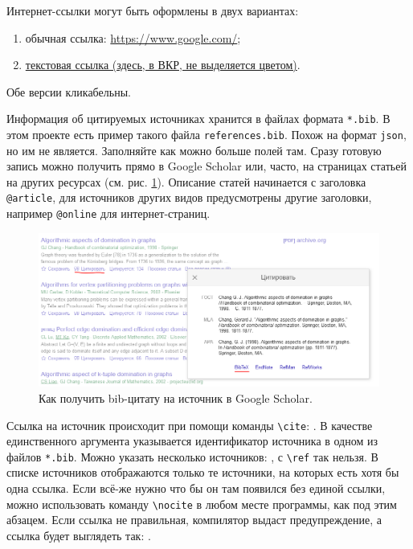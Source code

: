 \documentclass[a4paper, 14pt]{extreport}
\begin{document}
Интернет-ссылки могут быть оформлены в двух вариантах:
\begin{enumerate}
    \item обычная ссылка: \url{https://www.google.com/};
    \item \href{https://www.google.com/}{текстовая ссылка (здесь, в ВКР, не выделяется цветом)}.
\end{enumerate}
Обе версии кликабельны.

Информация об цитируемых источниках хранится в файлах формата \verb!*.bib!. В этом проекте есть пример такого файла \verb!references.bib!. Похож на формат \verb!json!, но им не является. Заполняйте как можно больше полей там. Сразу готовую запись можно получить прямо в Google Scholar или, часто, на страницах статьей на других ресурсах (см. рис. \ref{fig:scholar}). Описание статей начинается с заголовка \verb!@article!, для источников других видов предусмотрены другие заголовки, например \verb!@online! для интернет-страниц.

\begin{figure}[h]
    \centering
    \includegraphics[scale=0.5]{img/scholar.png}
    \caption{Как получить bib-цитату на источник в Google Scholar.}
    \label{fig:scholar}
\end{figure}

Ссылка на источник происходит при помощи команды \verb!\cite!: \cite{duportail:alu}. В качестве единственного аргумента указывается идентификатор источника в одном из файлов \verb!*.bib!. Можно указать несколько источников: \cite{duportail:alu, althusser:iia, husserl:pd}, с \verb!\ref! так нельзя. В списке источников отображаются только те источники, на которых есть хотя бы одна ссылка. Если всё-же нужно что бы он там появился без единой ссылки, можно использовать команду \verb!\nocite! в любом месте программы, как под этим абзацем. Если ссылка не правильная, компилятор выдаст предупреждение, а ссылка будет выглядеть так: \cite{wrong ref}.
\end{document}
